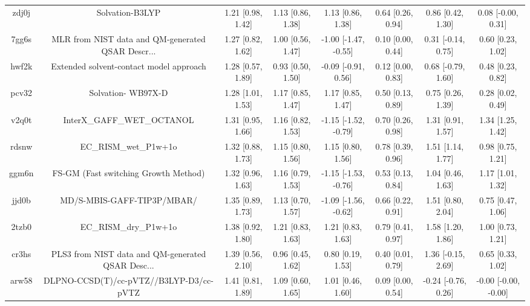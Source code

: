 \documentclass{article}
\begin{document}
\begin{center}
\begin{longtable}{|cccccccc|}
 zdj0j &                                    Solvation-B3LYP &  1.21 [0.98, 1.42] &  1.13 [0.86, 1.38] &     1.13 [0.86, 1.38] &  0.64 [0.26, 0.94] &    0.86 [0.42, 1.30] &    0.08 [-0.00, 0.31] \\
 7gg6s &  MLR from NIST data and QM-generated QSAR Descr... &  1.27 [0.82, 1.62] &  1.00 [0.56, 1.47] &  -1.00 [-1.47, -0.55] &  0.10 [0.00, 0.44] &   0.31 [-0.14, 0.75] &     0.60 [0.23, 1.02] \\
 hwf2k &            Extended solvent-contact model approach &  1.28 [0.57, 1.89] &  0.93 [0.50, 1.50] &   -0.09 [-0.91, 0.56] &  0.12 [0.00, 0.83] &   0.68 [-0.79, 1.60] &     0.48 [0.23, 0.82] \\
 pcv32 &                                 Solvation- WB97X-D &  1.28 [1.01, 1.53] &  1.17 [0.85, 1.47] &     1.17 [0.85, 1.47] &  0.50 [0.13, 0.89] &    0.75 [0.26, 1.39] &     0.28 [0.02, 0.49] \\
 v2q0t &                         InterX\_GAFF\_WET\_OCTANOL &  1.31 [0.95, 1.66] &  1.16 [0.82, 1.53] &  -1.15 [-1.52, -0.79] &  0.70 [0.26, 0.98] &    1.31 [0.91, 1.57] &     1.34 [1.25, 1.42] \\
 rdsnw &                              EC\_RISM\_wet\_P1w+1o &  1.32 [0.88, 1.73] &  1.15 [0.80, 1.56] &     1.15 [0.80, 1.56] &  0.78 [0.39, 0.96] &    1.51 [1.14, 1.77] &     0.98 [0.75, 1.21] \\
 ggm6n &               FS-GM (Fast switching Growth Method) &  1.32 [0.96, 1.63] &  1.16 [0.79, 1.53] &  -1.15 [-1.53, -0.76] &  0.53 [0.13, 0.84] &    1.04 [0.46, 1.63] &     1.17 [1.01, 1.32] \\
 jjd0b &                         MD/S-MBIS-GAFF-TIP3P/MBAR/ &  1.35 [0.89, 1.73] &  1.13 [0.70, 1.57] &  -1.09 [-1.56, -0.62] &  0.66 [0.22, 0.91] &    1.51 [0.80, 2.04] &     0.75 [0.47, 1.06] \\
 2tzb0 &                              EC\_RISM\_dry\_P1w+1o &  1.38 [0.92, 1.80] &  1.21 [0.83, 1.63] &     1.21 [0.83, 1.63] &  0.79 [0.41, 0.97] &    1.58 [1.20, 1.86] &     1.00 [0.73, 1.21] \\
 cr3hs &  PLS3 from NIST data and QM-generated QSAR Desc... &  1.39 [0.56, 2.10] &  0.96 [0.45, 1.62] &     0.80 [0.19, 1.53] &  0.40 [0.01, 0.79] &   1.36 [-0.15, 2.69] &     0.65 [0.33, 1.02] \\
 arw58 &            DLPNO-CCSD(T)/cc-pVTZ//B3LYP-D3/cc-pVTZ &  1.41 [0.81, 1.89] &  1.09 [0.60, 1.65] &     1.01 [0.46, 1.60] &  0.09 [0.00, 0.54] &  -0.24 [-0.76, 0.26] &  -0.00 [-0.00, -0.00] \\

\end{longtable}
\end{center}
\end{document}
